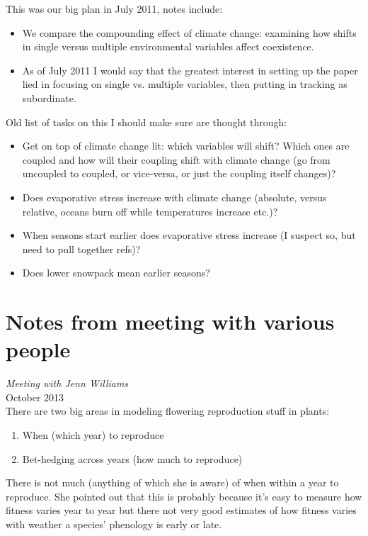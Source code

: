 \documentclass[11pt,a4paper,oneside]{article}
\begin{document}
This was our big plan in July 2011, notes include:\\
\begin{itemize}
\item We compare the compounding effect of climate change: examining
  how shifts in single versus multiple environmental variables affect
  coexistence.
\item As of July 2011 I would say that the greatest interest in setting up
the paper lied in focusing on single vs. multiple variables, then
putting in tracking as subordinate. 
\end{itemize}

\noindent Old list of tasks on this I should make sure are thought through:
\begin{itemize}
\item Get on top of climate change lit: which variables will shift?
  Which ones are coupled and how will their coupling shift with
  climate change (go from uncoupled to coupled, or vice-versa, or just
  the coupling itself changes)?
\item Does evaporative stress increase with climate change (absolute,
  versus relative, oceans burn off while temperatures increase etc.)?
\item When seasons start earlier does evaporative stress increase (I
  suspect so, but need to pull together refs)?
\item Does lower snowpack mean earlier seasons?
\end{itemize}


\newpage
\section{Notes from meeting with various people}

\noindent \emph{Meeting with Jenn Williams} \\

 October 2013\\

\noindent  There are two big areas in modeling flowering reproduction stuff in plants:
\begin{enumerate}
\item When (which year) to reproduce
\item Bet-hedging across years (how much to reproduce)
\end{enumerate}

\noindent There is not much (anything of which she is aware) of when within a year to reproduce. She pointed out that this is probably because it's easy to measure how fitness varies year to year but there not very good estimates of how fitness varies with weather a species' phenology is early or late.\\
\end{document}
